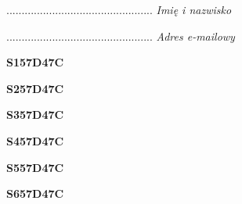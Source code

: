 \begin{turn}{90}\begin{minipage}{\linewidth} \vspace{20mm} ................................................  \textit{Imię i nazwisko}\end{minipage}\end{turn}

\begin{turn}{90}\begin{minipage}{\linewidth} \vspace{20mm} ................................................  \textit{Adres e-mailowy}\end{minipage}\end{turn}

\begin{turn}{90}\huge \begin{minipage}{\linewidth} \vspace{10mm}\textbf{S157D47C}\end{minipage}\end{turn}

\begin{turn}{90}\huge \begin{minipage}{\linewidth} \vspace{10mm}\textbf{S257D47C}\end{minipage}\end{turn}

\begin{turn}{90}\huge \begin{minipage}{\linewidth} \vspace{10mm}\textbf{S357D47C}\end{minipage}\end{turn}

\begin{turn}{90}\huge \begin{minipage}{\linewidth} \vspace{10mm}\textbf{S457D47C}\end{minipage}\end{turn}

\begin{turn}{90}\huge \begin{minipage}{\linewidth} \vspace{10mm}\textbf{S557D47C}\end{minipage}\end{turn}

\begin{turn}{90}\huge \begin{minipage}{\linewidth} \vspace{10mm}\textbf{S657D47C}\end{minipage}\end{turn}

